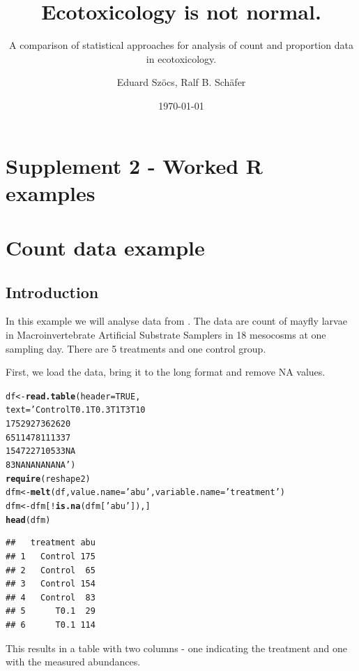 \documentclass{scrartcl}\usepackage[]{graphicx}\usepackage[]{color}
\title{Ecotoxicology is not normal.}
\subtitle{A comparison of statistical approaches for analysis of count and proportion data in ecotoxicology.}
\author{Eduard Szöcs, Ralf B. Schäfer}
\date{\today}
\makeatletter
\newcommand{\hlnum}[1]{\textcolor[rgb]{0.686,0.059,0.569}{#1}}%
\newcommand{\hlstr}[1]{\textcolor[rgb]{0.192,0.494,0.8}{#1}}%
\newcommand{\hlopt}[1]{\textcolor[rgb]{0,0,0}{#1}}%
\newcommand{\hlstd}[1]{\textcolor[rgb]{0.345,0.345,0.345}{#1}}%
\newcommand{\hlkwb}[1]{\textcolor[rgb]{0.69,0.353,0.396}{#1}}%
\newcommand{\hlkwc}[1]{\textcolor[rgb]{0.333,0.667,0.333}{#1}}%
\newcommand{\hlkwd}[1]{\textcolor[rgb]{0.737,0.353,0.396}{\textbf{#1}}}%
\newenvironment{kframe}{%
 \def\at@end@of@kframe{}%
 \ifinner\ifhmode%
  \def\at@end@of@kframe{\end{minipage}}%
  \begin{minipage}{\columnwidth}%
 \fi\fi%
 \def\FrameCommand##1{\hskip\@totalleftmargin \hskip-\fboxsep
 \colorbox{shadecolor}{##1}\hskip-\fboxsep
     \hskip-\linewidth \hskip-\@totalleftmargin \hskip\columnwidth}%
 \MakeFramed {\advance\hsize-\width
   \@totalleftmargin\z@ \linewidth\hsize
   \@setminipage}}%
 {\par\unskip\endMakeFramed%
 \at@end@of@kframe}
\newenvironment{knitrout}{}{} %
\renewenvironment{knitrout}{\begin{spacing}{1}}{\end{spacing}}
\makeatother
\begin{document}
\maketitle
\thispagestyle{empty}
\section*{Supplement 2 - Worked R examples}
\tableofcontents

\newpage
\section{Count data example}
\subsection{Introduction}
In this example we will analyse data from \citep{brock_minimum_2015}.
The data are count of mayfly larvae in Macroinvertebrate Artificial Substrate Samplers in 18 mesocosms at one sampling day.
There are 5 treatments and one control group.

First, we load the data, bring it to the long format and remove NA values.
\begin{knitrout}
\color{fgcolor}\begin{kframe}
\begin{alltt}
\hlstd{df} \hlkwb{<-} \hlkwd{read.table}\hlstd{(}\hlkwc{header} \hlstd{=} \hlnum{TRUE}\hlstd{,}
                 \hlkwc{text} \hlstd{=} \hlstr{'Control  T0.1 T0.3  T1  T3  T10
                          175 29  27  36  26  20
                          65  114 78  11  13  37
                          154 72  27  105 33  NA
                          83  NA  NA  NA  NA  NA'}\hlstd{)}
\hlkwd{require}\hlstd{(reshape2)}
\hlstd{dfm} \hlkwb{<-} \hlkwd{melt}\hlstd{(df,} \hlkwc{value.name} \hlstd{=} \hlstr{'abu'}\hlstd{,} \hlkwc{variable.name} \hlstd{=} \hlstr{'treatment'}\hlstd{)}
\hlstd{dfm} \hlkwb{<-} \hlstd{dfm[}\hlopt{!}\hlkwd{is.na}\hlstd{(dfm[}\hlstr{'abu'}\hlstd{]), ]}
\hlkwd{head}\hlstd{(dfm)}
\end{alltt}
\begin{verbatim}
##   treatment abu
## 1   Control 175
## 2   Control  65
## 3   Control 154
## 4   Control  83
## 5      T0.1  29
## 6      T0.1 114
\end{verbatim}
\end{kframe}
\end{knitrout}
This results in a table with two columns - one indicating the treatment and one with the measured abundances.
\end{document}
